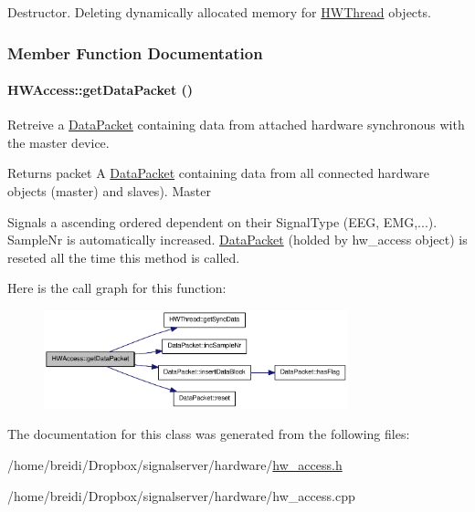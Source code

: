 Destructor. Deleting dynamically allocated memory for \hyperlink{class_h_w_thread}{HWThread} objects. 

\subsubsection{Member Function Documentation}
\hypertarget{class_h_w_access_a99d0f4c10e9def70d1189fc6c2100a20}{
\paragraph[{getDataPacket}]{ HWAccess::getDataPacket ()}\hfill}
\label{class_h_w_access_a99d0f4c10e9def70d1189fc6c2100a20}


Retreive a \hyperlink{class_data_packet}{DataPacket} containing data from attached hardware synchronous with the master device. \begin{DoxyReturn}{Returns}
packet A \hyperlink{class_data_packet}{DataPacket} containing data from all connected hardware objects (master) and slaves). Master
\end{DoxyReturn}
Signals a ascending ordered dependent on their SignalType (EEG, EMG,...). SampleNr is automatically increased. \hyperlink{class_data_packet}{DataPacket} (holded by hw\_\-access object) is reseted all the time this method is called. 

Here is the call graph for this function:\nopagebreak
\begin{figure}[H]
\begin{center}
\leavevmode
\includegraphics[width=250pt]{class_h_w_access_a99d0f4c10e9def70d1189fc6c2100a20_cgraph}
\end{center}
\end{figure}


The documentation for this class was generated from the following files:\begin{DoxyCompactItemize}
\item 
/home/breidi/Dropbox/signalserver/hardware/\hyperlink{hw__access_8h}{hw\_\-access.h}\item 
/home/breidi/Dropbox/signalserver/hardware/hw\_\-access.cpp\end{DoxyCompactItemize}
